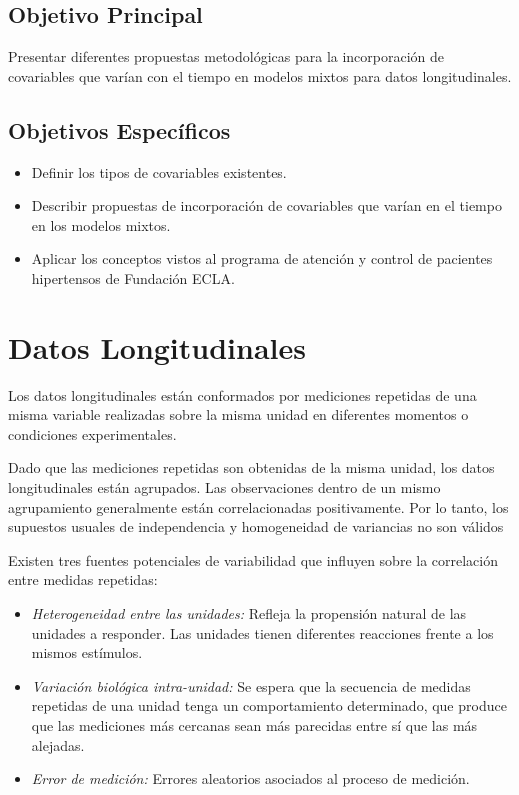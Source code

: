 \documentclass[spanish]{article}
\numberwithin{figure}{subsection}
\numberwithin{equation}{subsection}
\numberwithin{table}{subsection}
\begin{document}
\subsection{Objetivo Principal}

Presentar diferentes propuestas metodológicas para la incorporación de
covariables que varían con el tiempo en modelos mixtos para datos
longitudinales.

\subsection{Objetivos Específicos}

\begin{itemize}
	\item Definir los tipos de covariables existentes.
	\item Describir propuestas de incorporación de covariables que varían en el
	tiempo en los modelos mixtos.
	\item Aplicar los conceptos vistos al programa de
	atención y control de pacientes hipertensos de Fundación ECLA.
\end{itemize}

\newpage
\section{Datos Longitudinales}

Los datos longitudinales están conformados por mediciones repetidas de una misma
variable realizadas sobre la misma unidad en diferentes momentos o condiciones
experimentales.

Dado que las mediciones repetidas son obtenidas de la misma unidad, los datos
longitudinales están agrupados. Las observaciones dentro de un mismo
agrupamiento generalmente están correlacionadas positivamente. Por lo tanto, los
supuestos usuales de independencia y homogeneidad de variancias no son válidos

Existen tres fuentes potenciales de variabilidad que influyen sobre la
correlación entre medidas repetidas:

\begin{itemize}
	\item \textit{Heterogeneidad entre las unidades:} Refleja la propensión
	natural de las unidades a responder. Las unidades tienen diferentes
	reacciones frente a los mismos estímulos.
	\item \textit{Variación biológica intra-unidad:} Se espera que la secuencia
	de medidas repetidas de una unidad tenga un comportamiento determinado, que
	produce que las mediciones más cercanas sean más parecidas entre sí que las
	más alejadas.
	\item \textit{Error de medición:} Errores aleatorios asociados al proceso de
	medición.
\end{itemize}
\end{document}

